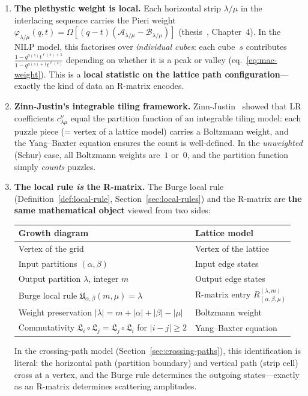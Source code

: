 \documentclass[11pt]{article}
\theoremstyle{plain}
\theoremstyle{definition}
\theoremstyle{remark}
\begin{document}
\begin{enumerate}
\item \textbf{The plethystic weight is local.}
  Each horizontal strip $\lambda/\mu$ in the interlacing
  sequence carries the Pieri weight
  $\varphi_{\lambda/\mu}(q,t)
  = \Omega[(q-t)(\mathcal{A}_{\lambda/\mu}
  - \mathcal{B}_{\lambda/\mu})]$
  (thesis~\cite{langer-thesis}, Chapter~4).
  In the NILP model, this factorises over \emph{individual
  cubes}: each cube~$s$ contributes
  $\frac{1-q^{a(s)}t^{\ell(s)+1}}{1-q^{a(s)+1}t^{\ell(s)}}$
  depending on whether it is a peak or valley
  (eq.~\eqref{eq:mac-weight}).
  This is a \textbf{local statistic on the lattice path
  configuration}---exactly the kind of data an R-matrix
  encodes.

\item \textbf{Zinn-Justin's integrable tiling framework.}
  Zinn-Justin~\cite{zinn-justin-2009} showed that LR
  coefficients $c_{\lambda\mu}^\nu$ equal the partition
  function of an integrable tiling model: each puzzle piece
  (= vertex of a lattice model) carries a Boltzmann weight,
  and the Yang--Baxter equation ensures the count is
  well-defined. In the \emph{unweighted} (Schur) case,
  all Boltzmann weights are~$1$ or~$0$, and the partition
  function simply \emph{counts} puzzles.

\item \textbf{The local rule \emph{is} the R-matrix.}
  The Burge local rule
  (Definition~\ref{def:local-rule}, Section~\ref{sec:local-rules})
  and the R-matrix are \textbf{the same mathematical object}
  viewed from two sides:
  \begin{center}
  \renewcommand{\arraystretch}{1.3}
  \begin{tabular}{l|l}
  \textbf{Growth diagram} & \textbf{Lattice model} \\ \hline
  Vertex of the grid & Vertex of the lattice \\
  Input partitions $(\alpha, \beta)$ & Input edge states \\
  Output partition $\lambda$, integer $m$ & Output edge states \\
  Burge local rule $\mathfrak{U}_{\alpha,\beta}(m,\mu)=\lambda$
    & R-matrix entry $R^{(\lambda,m)}_{(\alpha,\beta,\mu)}$ \\
  Weight preservation $|\lambda|=m+|\alpha|+|\beta|-|\mu|$
    & Boltzmann weight \\
  Commutativity $\mathfrak{L}_i \circ \mathfrak{L}_j
    = \mathfrak{L}_j \circ \mathfrak{L}_i$ for $|i-j|\geq 2$
    & Yang--Baxter equation
  \end{tabular}
  \end{center}
  In the crossing-path model (Section~\ref{sec:crossing-paths}),
  this identification is literal: the horizontal path (partition
  boundary) and vertical path (strip cell) cross at a vertex,
  and the Burge rule determines the outgoing states---exactly
  as an R-matrix determines scattering amplitudes.


\end{enumerate}
\end{document}
